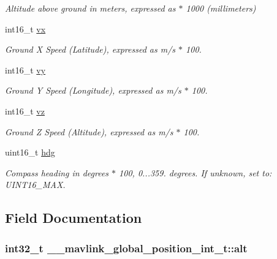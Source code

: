 \begin{DoxyCompactItemize}
\begin{DoxyCompactList}\small\item\em Altitude above ground in meters, expressed as $\ast$ 1000 (millimeters) \end{DoxyCompactList}\item 
int16\+\_\+t \hyperlink{struct____mavlink__global__position__int__t_a1f2bef1206e578e3f0f85f7854621829}{vx}
\begin{DoxyCompactList}\small\item\em Ground X Speed (Latitude), expressed as m/s $\ast$ 100. \end{DoxyCompactList}\item 
int16\+\_\+t \hyperlink{struct____mavlink__global__position__int__t_a89734a8b924f059f9e634233ce021cd3}{vy}
\begin{DoxyCompactList}\small\item\em Ground Y Speed (Longitude), expressed as m/s $\ast$ 100. \end{DoxyCompactList}\item 
int16\+\_\+t \hyperlink{struct____mavlink__global__position__int__t_ac476cea996cb642f139a93fc7f5ed2a4}{vz}
\begin{DoxyCompactList}\small\item\em Ground Z Speed (Altitude), expressed as m/s $\ast$ 100. \end{DoxyCompactList}\item 
uint16\+\_\+t \hyperlink{struct____mavlink__global__position__int__t_a60f7c02018c444cdffb6121dee854e19}{hdg}
\begin{DoxyCompactList}\small\item\em Compass heading in degrees $\ast$ 100, 0...359. degrees. If unknown, set to\+: U\+I\+N\+T16\+\_\+\+M\+A\+X. \end{DoxyCompactList}\end{DoxyCompactItemize}


\subsection{Field Documentation}
\hypertarget{struct____mavlink__global__position__int__t_a1d9e69a26dc214bd624c9474ca3d79f4}{
\subsubsection[{alt}]{\setlength{\rightskip}{0pt plus 5cm}int32\+\_\+t \+\_\+\+\_\+mavlink\+\_\+global\+\_\+position\+\_\+int\+\_\+t\+::alt}}\label{struct____mavlink__global__position__int__t_a1d9e69a26dc214bd624c9474ca3d79f4}


